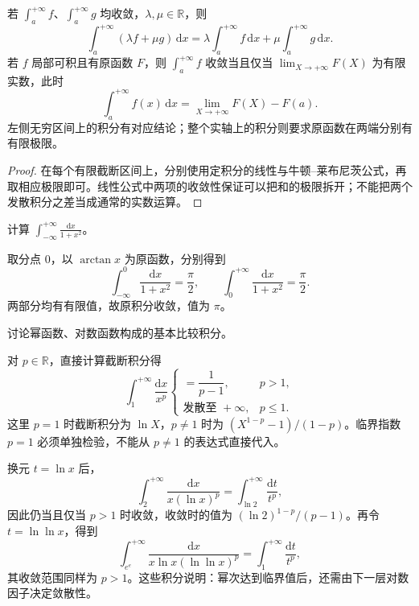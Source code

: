 \documentclass[UTF8,12pt,a4paper,fontset=fandol]{ctexbook}
\begin{document}
\begin{proposition}[收敛积分的线性与原函数计算]
\label{prop:improper-integral-linearity-and-primitives}
若 $\int_a^{+\infty}f$、$\int_a^{+\infty}g$ 均收敛，$\lambda,\mu\in\mathbb{R}$，则
\[
    \int_a^{+\infty}(\lambda f+\mu g)\,\mathrm{d}x
    =\lambda\int_a^{+\infty}f\,\mathrm{d}x
     +\mu\int_a^{+\infty}g\,\mathrm{d}x.
\]
若 $f$ 局部可积且有原函数 $F$，则 $\int_a^{+\infty}f$ 收敛当且仅当 $\lim_{X\to+\infty}F(X)$ 为有限实数，此时
\begin{equation}
    \int_a^{+\infty}f(x)\,\mathrm{d}x
    =\lim_{X\to+\infty}F(X)-F(a).
    \label{eq:improper-newton-leibniz}
\end{equation}
左侧无穷区间上的积分有对应结论；整个实轴上的积分则要求原函数在两端分别有有限极限。
\end{proposition}

\begin{proof}
在每个有限截断区间上，分别使用定积分的线性与牛顿--莱布尼茨公式，再取相应极限即可。线性公式中两项的收敛性保证可以把和的极限拆开；不能把两个发散积分之差当成通常的实数运算。
\end{proof}

\begin{example}
\label{ex:improper-integral-arctangent}
计算 $\int_{-\infty}^{+\infty}\frac{\mathrm{d}x}{1+x^2}$。
\end{example}

\begin{solve}
取分点 $0$，以 $\arctan x$ 为原函数，分别得到
\[
    \int_{-\infty}^0\frac{\mathrm{d}x}{1+x^2}=\frac\pi2,
    \qquad
    \int_0^{+\infty}\frac{\mathrm{d}x}{1+x^2}=\frac\pi2.
\]
两部分均有有限值，故原积分收敛，值为 $\pi$。
\end{solve}

\begin{example}
\label{ex:improper-power-and-log-benchmarks}
讨论幂函数、对数函数构成的基本比较积分。
\end{example}

\begin{solve}
对 $p\in\mathbb{R}$，直接计算截断积分得
\begin{equation}
    \int_1^{+\infty}\frac{\mathrm{d}x}{x^p}
    \begin{cases}
        =\dfrac1{p-1},&p>1,\\
        \text{发散至 }+\infty,&p\leq1.
    \end{cases}
    \label{eq:infinite-power-integral-benchmark}
\end{equation}
这里 $p=1$ 时截断积分为 $\ln X$，$p\neq1$ 时为 $(X^{1-p}-1)/(1-p)$。临界指数 $p=1$ 必须单独检验，不能从 $p\neq1$ 的表达式直接代入。

换元 $t=\ln x$ 后，
\[
    \int_2^{+\infty}\frac{\mathrm{d}x}{x(\ln x)^p}
    =\int_{\ln2}^{+\infty}\frac{\mathrm{d}t}{t^p},
\]
因此仍当且仅当 $p>1$ 时收敛，收敛时的值为 $(\ln2)^{1-p}/(p-1)$。再令 $t=\ln\ln x$，得到
\[
    \int_{e^e}^{+\infty}
        \frac{\mathrm{d}x}{x\ln x(\ln\ln x)^p}
    =\int_1^{+\infty}\frac{\mathrm{d}t}{t^p},
\]
其收敛范围同样为 $p>1$。这些积分说明：幂次达到临界值后，还需由下一层对数因子决定敛散性。
\end{solve}
\end{document}

